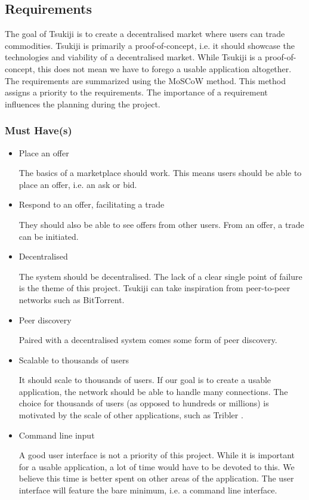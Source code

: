 \subsection{Requirements}
\label{requirements}

The goal of Tsukiji is to create a decentralised market where users can trade commodities.
Tsukiji is primarily a proof-of-concept, i.e. it should showcase the technologies and viability of a decentralised market.
While Tsukiji is a proof-of-concept, this does not mean we have to forego a usable application altogether.
The requirements are summarized using the MoSCoW method.
This method assigns a priority to the requirements.
The importance of a requirement influences the planning during the project.

\subsubsection{Must Have(s)}
\begin{itemize}
\item Place an offer

The basics of a marketplace should work.
This means users should be able to place an offer, i.e. an ask or bid.

\item Respond to an offer, facilitating a trade

They should also be able to see offers from other users.
From an offer, a trade can be initiated.

\item Decentralised

The system should be decentralised.
The lack of a clear single point of failure is the theme of this project.
Tsukiji can take inspiration from peer-to-peer networks such as BitTorrent.

\item Peer discovery

Paired with a decentralised system comes some form of peer discovery.

\item Scalable to thousands of users

It should scale to thousands of users.
If our goal is to create a usable application, the network should be able to handle many connections.
The choice for thousands of users (as opposed to hundreds or millions) is motivated by the scale of other applications, such as Tribler \cite{tribler}. %

\item Command line input

A good user interface is not a priority of this project.
While it is important for a usable application, a lot of time would have to be devoted to this.
We believe this time is better spent on other areas of the application.
The user interface will feature the bare minimum, i.e. a command line interface.
\end{itemize}

